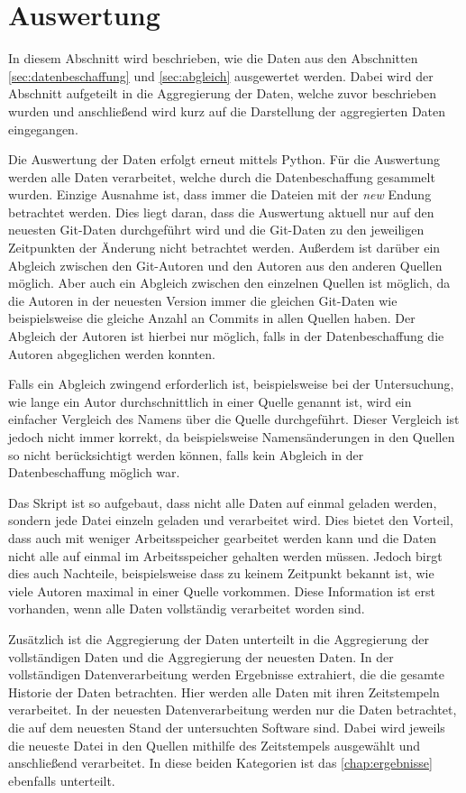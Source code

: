 \section{Auswertung}
\label{sec:auswertung}
In diesem Abschnitt wird beschrieben, wie die Daten aus den Abschnitten \ref{sec:datenbeschaffung} und \ref{sec:abgleich} ausgewertet werden.
Dabei wird der Abschnitt aufgeteilt in die Aggregierung der Daten, welche zuvor beschrieben wurden und anschließend wird kurz auf die Darstellung der aggregierten Daten eingegangen.

Die Auswertung der Daten erfolgt erneut mittels Python.
Für die Auswertung werden alle Daten verarbeitet, welche durch die Datenbeschaffung gesammelt wurden.
Einzige Ausnahme ist, dass immer die Dateien mit der \emph{new} Endung betrachtet werden.
Dies liegt daran, dass die Auswertung aktuell nur auf den neuesten Git-Daten durchgeführt wird und die Git-Daten zu den jeweiligen Zeitpunkten der Änderung nicht betrachtet werden.
Außerdem ist darüber ein Abgleich zwischen den Git-Autoren und den Autoren aus den anderen Quellen möglich.
Aber auch ein Abgleich zwischen den einzelnen Quellen ist möglich, da die Autoren in der neuesten Version immer die gleichen Git-Daten wie beispielsweise die gleiche Anzahl an Commits in allen Quellen haben.
Der Abgleich der Autoren ist hierbei nur möglich, falls in der Datenbeschaffung die Autoren abgeglichen werden konnten.

Falls ein Abgleich zwingend erforderlich ist, beispielsweise bei der Untersuchung, wie lange ein Autor durchschnittlich in einer Quelle genannt ist, wird ein einfacher Vergleich des Namens über die Quelle durchgeführt.
Dieser Vergleich ist jedoch nicht immer korrekt, da beispielsweise Namensänderungen in den Quellen so nicht berücksichtigt werden können, falls kein Abgleich in der Datenbeschaffung möglich war.

Das Skript ist so aufgebaut, dass nicht alle Daten auf einmal geladen werden, sondern jede Datei einzeln geladen und verarbeitet wird.
Dies bietet den Vorteil, dass auch mit weniger Arbeitsspeicher gearbeitet werden kann und die Daten nicht alle auf einmal im Arbeitsspeicher gehalten werden müssen.
Jedoch birgt dies auch Nachteile, beispielsweise dass zu keinem Zeitpunkt bekannt ist, wie viele Autoren maximal in einer Quelle vorkommen.
Diese Information ist erst vorhanden, wenn alle Daten vollständig verarbeitet worden sind.

Zusätzlich ist die Aggregierung der Daten unterteilt in die Aggregierung der vollständigen Daten und die Aggregierung der neuesten Daten.
In der vollständigen Datenverarbeitung werden Ergebnisse extrahiert, die die gesamte Historie der Daten betrachten.
Hier werden alle Daten mit ihren Zeitstempeln verarbeitet.
In der neuesten Datenverarbeitung werden nur die Daten betrachtet, die auf dem neuesten Stand der untersuchten Software sind.
Dabei wird jeweils die neueste Datei in den Quellen mithilfe des Zeitstempels ausgewählt und anschließend verarbeitet.
In diese beiden Kategorien ist das \autoref{chap:ergebnisse} ebenfalls unterteilt.
